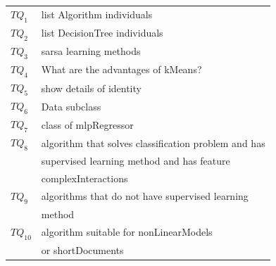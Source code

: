 \documentclass[12pt,a4paper,twoside]{report}
\begin{document}
\begin{small}
\begin{tabular}{ll}
$TQ_1$ & list Algorithm individuals\\
$TQ_2$ & list DecisionTree individuals\\
$TQ_3$ & sarsa learning methods\\
$TQ_4$ & What are the advantages of kMeans?\\
$TQ_5$ & show details of identity\\
$TQ_6$ & Data subclass\\
$TQ_7$ & class of mlpRegressor\\
$TQ_8$ & algorithm that solves classification problem and has\\
 & supervised learning method and has feature \\
 & complexInteractions \\
$TQ_9$ & algorithms that do not have supervised learning  \\
& method \\
$TQ_{10}$ & algorithm suitable for nonLinearModels \\
& or shortDocuments\\
\end{tabular}
\end{small}
\end{document}
